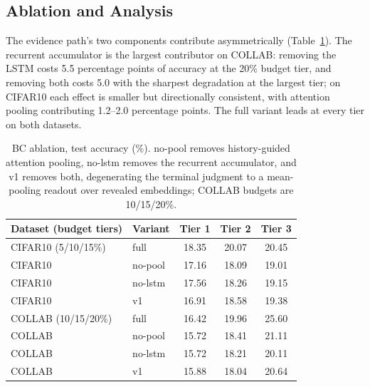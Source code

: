 \documentclass{article}
\begin{document}
\subsection{Ablation and Analysis}
\label{subsec:ablation}

The evidence path's two components contribute asymmetrically (Table~\ref{tab:ablation}). The recurrent accumulator is the largest contributor on COLLAB: removing the LSTM costs 5.5 percentage points of accuracy at the 20\% budget tier, and removing both costs 5.0 with the sharpest degradation at the largest tier; on CIFAR10 each effect is smaller but directionally consistent, with attention pooling contributing 1.2--2.0 percentage points. The full variant leads at every tier on both datasets.

\begin{table}[!htb]
\centering
\caption{BC ablation, test accuracy (\%). no-pool removes history-guided attention pooling, no-lstm removes the recurrent accumulator, and v1 removes both, degenerating the terminal judgment to a mean-pooling readout over revealed embeddings; COLLAB budgets are 10/15/20\%.}
\label{tab:ablation}
\begin{tabular}{llccc}
\toprule
Dataset (budget tiers) & Variant & Tier 1 & Tier 2 & Tier 3 \\
\midrule
CIFAR10 (5/10/15\%) & full    & 18.35 & 20.07 & 20.45 \\
CIFAR10             & no-pool & 17.16 & 18.09 & 19.01 \\
CIFAR10             & no-lstm & 17.56 & 18.26 & 19.15 \\
CIFAR10             & v1      & 16.91 & 18.58 & 19.38 \\
COLLAB (10/15/20\%) & full    & 16.42 & 19.96 & 25.60 \\
COLLAB              & no-pool & 15.72 & 18.41 & 21.11 \\
COLLAB              & no-lstm & 15.72 & 18.21 & 20.11 \\
COLLAB              & v1      & 15.88 & 18.04 & 20.64 \\
\bottomrule
\end{tabular}
\end{table}
\end{document}
